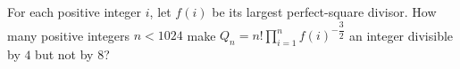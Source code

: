 For each positive integer $i$, let $f(i)$ be its largest perfect-square divisor. How many positive integers $n<1024$ make $Q_n=n!\prod_{i=1}^{n}f(i)^{-\dfrac{3}{2}}$ an integer divisible by $4$ but not by $8$?
